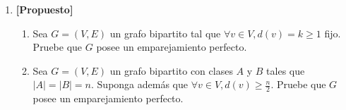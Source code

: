 \begin{enumerate}[label ={\bf P\arabic*}]
	\item \textbf{[Propuesto]}
	\begin{enumerate}
		\item Sea $G=(V,E)$ un grafo bipartito tal que $\forall v \in V, d(v)=k \geq 1$ fijo. Pruebe que $G$ posee un emparejamiento perfecto.
		\item Sea $G=(V,E)$ un grafo bipartito con clases $A$ y $B$ tales que $|A|=|B|=n$. Suponga además que $\forall v \in V, d(v) \geq \frac{n}{2}$. Pruebe que $G$ posee un emparejamiento perfecto.
	\end{enumerate}

\end{enumerate}
